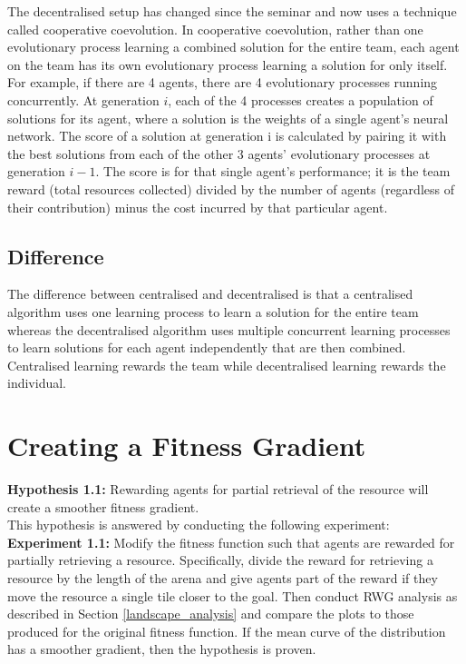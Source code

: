 \documentclass[12pt]{article}
\begin{document}
The decentralised setup has changed since the seminar and now uses a technique called cooperative coevolution. 
In cooperative coevolution, rather than one evolutionary process learning a combined solution for the entire team, each agent on the team has its own evolutionary process learning a solution for only itself. 
For example, if there are 4 agents, there are 4 evolutionary processes running concurrently. 
At generation $i$, each of the 4 processes creates a population of solutions for its agent, where a solution is the weights of a single agent’s neural network. 
The score of a solution at generation i is calculated by pairing it with the best solutions from each of the other 3 agents’ evolutionary processes at generation $i-1$. 
The score is for that single agent’s performance; it is the team reward (total resources collected) divided by the number of agents (regardless of their contribution) minus the cost incurred by that particular agent.\\

\subsection{Difference}

The difference between centralised and decentralised is that a centralised algorithm uses one learning process to learn a solution for the entire team whereas the decentralised algorithm uses multiple concurrent learning processes to learn solutions for each agent independently that are then combined. 
Centralised learning rewards the team while decentralised learning rewards the individual.\\

\section{Creating a Fitness Gradient}\label{smooth_fitness}

\textbf{Hypothesis 1.1:} Rewarding agents for partial retrieval of the resource will create a smoother fitness gradient.\\

This hypothesis is answered by conducting the following experiment:\\

\textbf{Experiment 1.1:} Modify the fitness function such that agents are rewarded for partially retrieving a resource.
Specifically, divide the reward for retrieving a resource by the length of the arena and give agents part of the reward if they move the resource a single tile closer to the goal.
Then conduct RWG analysis as described in Section \ref{landscape_analysis} and compare the plots to those produced for the original fitness function.
If the mean curve of the distribution has a smoother gradient, then the hypothesis is proven.\\
\end{document}
